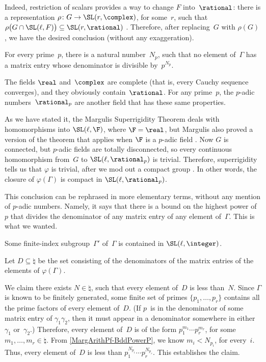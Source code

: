 Indeed, restriction of scalars  provides a way to change $F$
into~$\rational$: there is a representation $\rho \colon G
\to \SL(r,\complex)$, for some~$r$, such that 
$\rho \bigl( G \cap \SL(\ell,F) \bigr) \subseteq \SL(r,\rational)$ 
. Therefore, after
replacing~$G$ with $\rho(G)$, we have the
desired conclusion (without any exaggeration).



\begin{step} \label{MargArithPf-BddPowerP}
For every prime~$p$, there is a natural number~$N_p$, such 
that no element of\/~$\Gamma$ has a matrix entry whose 
denominator is divisible by~$p^{N_p}$. 
\end{step}
The fields $\real$ and~$\complex$ are complete (that is,
every Cauchy sequence converges), and they obviously 
contain~$\rational$. For any prime~$p$, the $p$-adic 
numbers~$\rational_p$ are another field that has these
same properties.

As we have stated it, the Margulis Superrigidity Theorem
deals with homomorphisms into $\SL(\ell,\F)$, where $\F = \real$,
but Margulis also proved a version of the theorem
that applies when $\F$ is a $p$-adic field . 
Now $G$ is connected,
but $p$-adic fields are totally disconnected, so every continuous 
homomorphism from~$G$ to $\SL(\ell,\rational_p)$ is trivial.
Therefore, superrigidity tells us that $\varphi$ is trivial, after we mod
out a compact group .
In other words, the closure of 
$\varphi(\Gamma)$ is compact in $\SL(\ell,\rational_p)$.

This conclusion can be rephrased in more elementary terms,
without any mention of $p$-adic
numbers. Namely, it says that there is a bound on the 
highest power of~$p$ that divides the denominator of any matrix entry of
any element of~$\Gamma$. This is what we wanted.


\begin{step}
Some finite-index subgroup\/~$\Gamma'$ of\/~$\Gamma$ is 
contained in\/ $\SL(\ell,\integer)$.
\end{step}
 Let $D \subseteq \natural$ be the set consisting of the
denominators of the matrix entries of the elements of
$\varphi(\Gamma)$. 

We claim there exists $N \in \natural$, such that every
element of~$D$ is less than~$N$.
Since $\Gamma$ is known to be finitely generated,
some finite set of primes $\{p_1,\ldots,p_r\}$ contains all
the prime factors of every element of~$D$. (If $p$~is in the
denominator of some matrix entry of $\gamma_1
\gamma_2$, then it must
appear in a denominator somewhere in either $\gamma_1$
or~$\gamma_2$.) Therefore, every element of~$D$ is of the
form $p_1^{m_1} \cdots p_r^{m_r}$, for some $m_1,\ldots,m_r
\in \natural$. From \cref{MargArithPf-BddPowerP}, 
we know $m_i < N_{p_i}$,
for every~$i$. Thus, every element of~$D$ is less than 
$p_1^{N_{p_1}} \cdots p_r^{N_{p_r}}$. This establishes
the claim.

